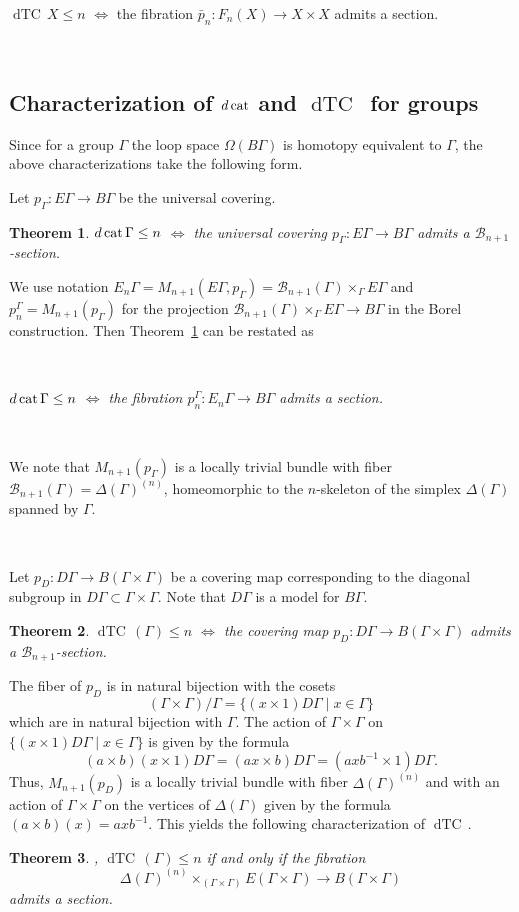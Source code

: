 \documentclass{amsart}
\numberwithin{equation}{section}
\theoremstyle{plain}
\newtheorem{thm}{Theorem}[subsection]
\theoremstyle{definition}
\def\dTC{{\mathop\mathrm{dTC}\,}}
\def\cat{\protect\operatorname{cat}}
\begin{document}
$\dTC X\le n$ $\Leftrightarrow$ the fibration $\bar p_n:F_n(X)\to X\times X$ admits a section.

 
\

\subsection {Characterization of $d\cat$ and $\dTC$ for groups}

Since for a group $\Gamma$ the loop space $\Omega(B\Gamma)$ is homotopy equivalent to $\Gamma$, the above characterizations take the following form.

Let $p_\Gamma:E\Gamma\to B\Gamma$ be the universal covering. 
\begin{thm}\label{dcat for group}\cite{Dr2,KW1,KW2}
$d\cat \Gamma\le n$ $\Leftrightarrow$ the universal covering $p_\Gamma:E\Gamma\to B\Gamma$ admits a $\mathcal B_{n+1}$-section.
\end{thm}
We use notation $E_n\Gamma=M_{n+1}(E\Gamma, p_\Gamma)=\mathcal B_{n+1}(\Gamma)\times_\Gamma E\Gamma$ and $p_n^\Gamma=M_{n+1}(p_\Gamma)$ for the projection
$\mathcal B_{n+1}(\Gamma)\times_\Gamma E\Gamma\to B\Gamma$ in the Borel construction.
Then Theorem~\ref{dcat for group} can be restated as

\

{\em $d\cat \Gamma\le n$ $\Leftrightarrow$ the fibration $p_n^\Gamma:E_n\Gamma\to B\Gamma$ admits a section.}

\

We note that $M_{n+1}(p_\Gamma)$ is a locally trivial bundle with fiber $\mathcal B_{n+1}(\Gamma)=\Delta(\Gamma)^{(n)}$,
homeomorphic to the $n$-skeleton of the simplex $\Delta(\Gamma)$ spanned by $\Gamma$.

\

Let $p_D:D\Gamma\to B(\Gamma\times\Gamma)$ be a covering map corresponding to the diagonal subgroup in $D\Gamma\subset\Gamma\times\Gamma$.
Note that $D\Gamma$ is a model for $B\Gamma$.
\begin{thm}\label{dTC for group}\cite{Dr2,KW1,KW2}
$\dTC(\Gamma)\le n$ $\Leftrightarrow$ the covering map $p_D:D\Gamma\to B(\Gamma\times\Gamma)$ admits a $\mathcal B_{n+1}$-section.
\end{thm}
The fiber of $p_D$ is in natural bijection with the cosets $$(\Gamma\times\Gamma)/\Gamma=\{(x\times 1)D\Gamma\mid x\in\Gamma\}$$ which are in natural bijection with $\Gamma$.
The action of $\Gamma\times\Gamma$ on $\{(x\times 1)D\Gamma\mid x\in\Gamma\}$ is given by the formula
$$
(a\times b)(x\times 1)D\Gamma=(ax\times b)D\Gamma=(axb^{-1}\times 1)D\Gamma.
$$
Thus,  $M_{n+1}(p_D)$ is a locally trivial bundle with fiber $\Delta(\Gamma)^{(n)}$ and with an action of $\Gamma\times\Gamma$ on the vertices of $\Delta(\Gamma)$
given by  the formula $(a\times b)(x)=axb^{-1}$. This yields the following characterization of $\dTC$.
\begin{thm}\label{better dTC}\cite{KW1},\cite{KW2}
$\dTC(\Gamma)\le n$ if and only if the fibration $$\Delta(\Gamma)^{(n)}\times_{(\Gamma\times\Gamma)}E(\Gamma\times\Gamma)\to B(\Gamma\times\Gamma)$$
admits a section.
\end{thm}
\end{document}
